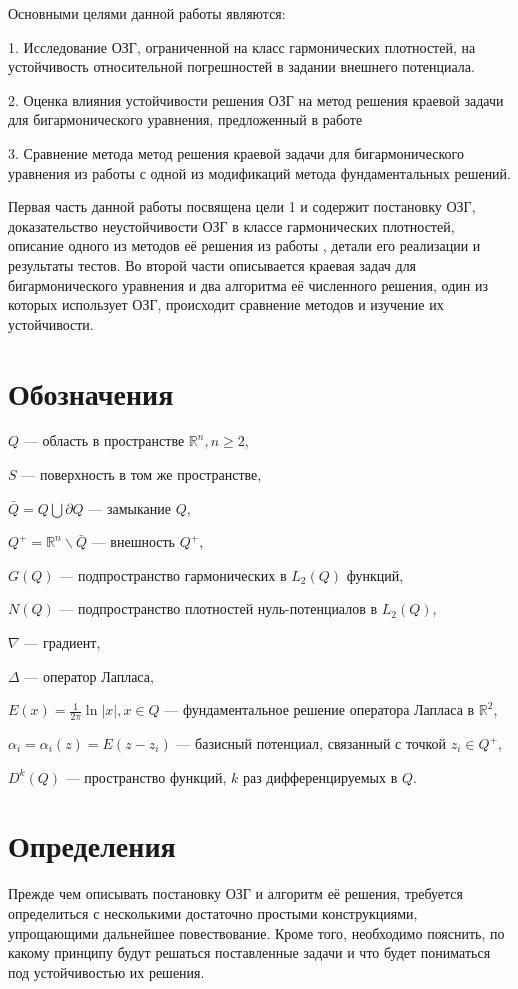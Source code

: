 \documentclass[a4paper]{article}
\newcommand{\R}[1]{\mathbb{R}^#1}
\begin{document}
Основными целями данной работы являются:

1. Исследование ОЗГ, ограниченной на класс гармонических плотностей, на устойчивость  относительной погрешностей в задании внешнего потенциала.

2. Оценка влияния устойчивости решения ОЗГ на метод решения краевой задачи для бигармонического уравнения, предложенный в работе \cite{lezh}

3. Сравнение метода  метод решения краевой задачи для бигармонического уравнения из работы \cite{lezh2} с одной из модификаций метода фундаментальных решений.


Первая часть данной работы посвящена цели 1  и содержит  постановку ОЗГ,  доказательство неустойчивости ОЗГ в классе гармонических плотностей, описание одного из методов её решения из работы \cite{lezh2}, детали его реализации и результаты тестов.
Во второй части описывается краевая задач для бигармонического уравнения и два алгоритма её численного решения, один из которых использует ОЗГ,  происходит сравнение методов и изучение их устойчивости.

\newpage
\section{Обозначения}

$Q$ --- область в пространстве $\mathbb{R}^n, n\geq 2$, 

$S$ --- поверхность в том же пространстве,

$\bar Q = Q \bigcup \partial Q$ --- замыкание $Q$,

$Q^+= \R{n}\backslash \bar Q$ --- внешность $Q^+$,

$G(Q)$ --- подпространство гармонических в $L_2(Q)$ функций,

$N(Q)$ --- подпространство плотностей нуль-потенциалов в $L_2(Q)$,

$\nabla$ --- градиент,

$\Delta$ --- оператор Лапласа,

$E(x)= \frac{1}{2\pi}  \ln |x|, x \in Q$ --- фундаментальное решение оператора Лапласа в $\R{2}$,

$\alpha_i=\alpha_i(z)=E(z-z_i)$ --- базисный потенциал, связанный с точкой $z_i \in Q^+$,

$D^k(Q)$ --- пространство функций, $k$ раз дифференцируемых в $Q$.

\newpage
\section{Определения}
Прежде чем описывать постановку ОЗГ и алгоритм её решения,
требуется определиться с несколькими достаточно простыми конструкциями,
упрощающими дальнейшее повествование.
Кроме того, необходимо пояснить, по какому принципу будут решаться поставленные задачи и что будет пониматься под устойчивостью их решения.
\end{document}
